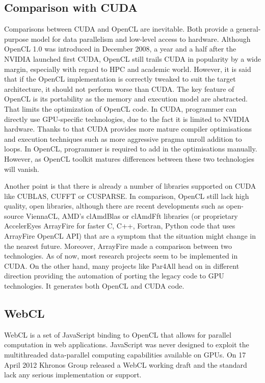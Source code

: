 \subsection{Comparison with CUDA}
Comparisons between CUDA and OpenCL are inevitable. Both provide a general-purpose model for data parallelism and low-level access to hardware. Although OpenCL 1.0 was introduced in December 2008, a year and a half after the NVIDIA launched first CUDA, OpenCL still trails CUDA in popularity by a wide margin, especially with regard to HPC and academic world.\cite{hpcwire2012reserachers} However, it is said that if the OpenCL implementation is correctly tweaked to suit the target architecture, it should not perform worse than CUDA. The key feature of OpenCL is its portability as the memory and execution model are abstracted. That limits the optimization of OpenCL code. In CUDA, programmer can directly use GPU-specific technologies, due to the fact it is limited to NVIDIA hardware. Thanks to that CUDA provides more mature compiler optimisations and execution techniques such as more aggressive pragma unroll addition to loops. In OpenCL, programmer is required to add in the optimisations manually. However, as OpenCL toolkit matures differences between these two technologies will vanish.\cite{hpcwire2012openclgains}

Another point is that there is already a number of libraries supported on CUDA like CUBLAS, CUFFT or CUSPARSE. In comparison, OpenCL still lack high quality, open libraries, although there are recent developments such as open-source ViennaCL\cite{viennacl2012}, AMD's clAmdBlas or clAmdFft libraries (or proprietary AccelerEyes ArrayFire for faster C, C++, Fortran, Python code that uses ArrayFire OpenCL API) that are a symptom that the situation might change in the nearest future. Moreover, ArrayFire made a comparison between two technologies.\cite{accelereyes2012vs} As of now, most research projects seem to be implemented in CUDA. On the other hand, many projects like Par4All\cite{par4all2012} head on in different direction providing the automation of porting the legacy code to GPU technologies. It generates both OpenCL and CUDA code. 

\subsection{WebCL}
WebCL is a set of JavaScript binding to OpenCL that allows for parallel computation in web applications. JavaScript was never designed to exploit the multithreaded data-parallel computing capabilities available on GPUs. On 17 April 2012 Khronos Group released a WebCL working draft and the standard lack any serious implementation or support.\cite{khronos2012webcl}

